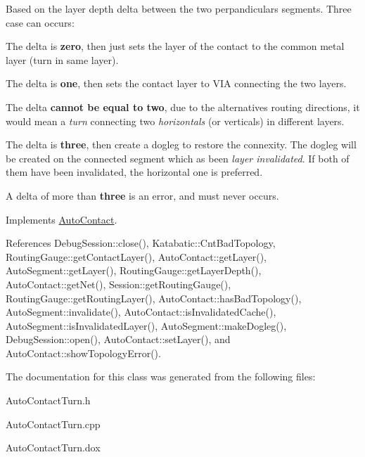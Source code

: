Based on the layer depth delta between the two perpandiculars segments. Three case can occurs\-:
\begin{DoxyItemize}
\item The delta is {\bfseries zero}, then just sets the layer of the contact to the common metal layer (turn in same layer).
\item The delta is {\bfseries one}, then sets the contact layer to V\-I\-A connecting the two layers.
\item The delta {\bfseries cannot be equal to two}, due to the alternatives routing directions, it would mean a {\itshape turn} connecting two {\itshape horizontals} (or verticals) in different layers.
\item The delta is {\bfseries three}, then create a dogleg to restore the connexity. The dogleg will be created on the connected segment which as been {\itshape layer invalidated}. If both of them have been invalidated, the horizontal one is preferred.
\item A delta of more than {\bfseries three} is an error, and must never occurs.
\end{DoxyItemize}

 

Implements \hyperlink{classKatabatic_1_1AutoContact_a690764ddc997fe9766a79c4b8e0c3e2f}{Auto\-Contact}.



References Debug\-Session\-::close(), Katabatic\-::\-Cnt\-Bad\-Topology, Routing\-Gauge\-::get\-Contact\-Layer(), Auto\-Contact\-::get\-Layer(), Auto\-Segment\-::get\-Layer(), Routing\-Gauge\-::get\-Layer\-Depth(), Auto\-Contact\-::get\-Net(), Session\-::get\-Routing\-Gauge(), Routing\-Gauge\-::get\-Routing\-Layer(), Auto\-Contact\-::has\-Bad\-Topology(), Auto\-Segment\-::invalidate(), Auto\-Contact\-::is\-Invalidated\-Cache(), Auto\-Segment\-::is\-Invalidated\-Layer(), Auto\-Segment\-::make\-Dogleg(), Debug\-Session\-::open(), Auto\-Contact\-::set\-Layer(), and Auto\-Contact\-::show\-Topology\-Error().



The documentation for this class was generated from the following files\-:\begin{DoxyCompactItemize}
\item 
Auto\-Contact\-Turn.\-h\item 
Auto\-Contact\-Turn.\-cpp\item 
Auto\-Contact\-Turn.\-dox\end{DoxyCompactItemize}
